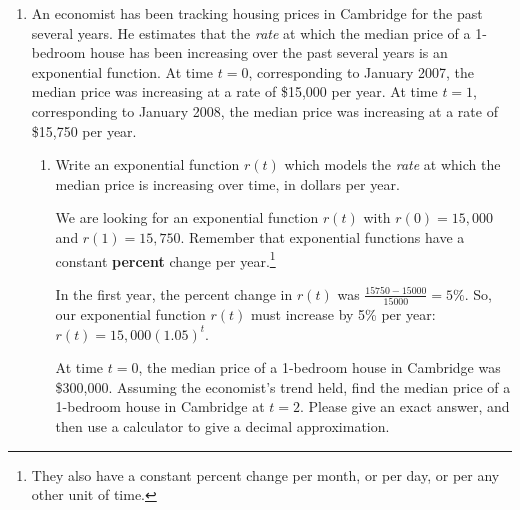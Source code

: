 \documentclass{article}
\begin{document}
\begin{enumerate}
\begin{enumerate}
\begin{solution}
      \emph{Note:} If the object is always traveling in the negative
      direction, then its net change in position will simply be the
      negative of the distance traveled. 
    \end{solution}
  \end{enumerate}

\iffalse
\item 

An economist has been tracking housing prices in Cambridge for the past
  several years.  He estimates that the \emph{rate} at which the median
  price of a 1-bedroom house has been increasing over the past several
  years is an exponential function.  At time $t = 0$, corresponding to
  January 2007, the median price was increasing at a rate of \$15,000 per
  year.  At time $t = 1$, corresponding to January 2008, the median price
  was increasing at a rate of \$15,750 per year.
  \begin{enumerate}
  \item

    \begin{problem}
      Write an exponential function $r(t)$ which models the \emph{rate} at
      which the median price is increasing over time, in dollars per
      year.  
    \end{problem}

    \begin{solution}
      We are looking for an exponential function $r(t)$ with $r(0) =
      15,000$ and $r(1) = 15,750$.  Remember that exponential functions
      have a constant \textbf{percent} change per year.\footnote{They also
        have a constant percent change per month, or per day, or per any
        other unit of time.}

      In the first year, the percent change in $r(t)$ was $\frac{15750 -
        15000}{15000} = 5\%$.  So, our exponential function $r(t)$ must
      increase by 5\% per year: $\boxed{r(t) = 15,000 (1.05)^t}$.
    \end{solution}

  \calcitem
    \begin{problem}
      At time $t = 0$, the median price of a 1-bedroom house in Cambridge
      was \$300,000.  Assuming the economist's trend held, find the median
      price of a 1-bedroom house in Cambridge at $t = 2$.  Please give an
      exact answer, and then use a calculator to give a decimal
      approximation. 
    \end{problem}


\end{enumerate}
\end{enumerate}
\end{document}
